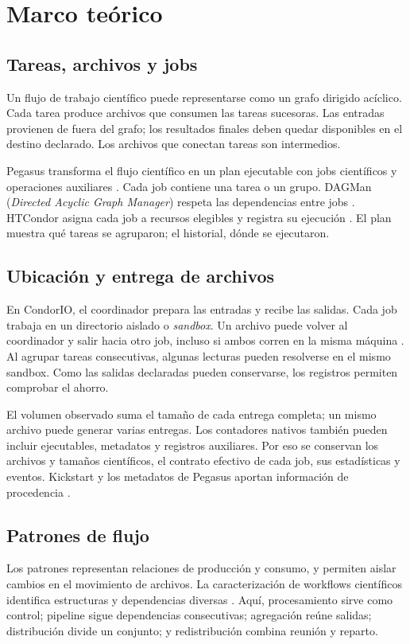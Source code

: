 \chapter{Marco teórico}
\label{ch:marco}
\section{Tareas, archivos y jobs}
Un flujo de trabajo científico puede representarse como un grafo dirigido acíclico. Cada tarea produce archivos que consumen las tareas sucesoras. Las entradas provienen de fuera del grafo; los resultados finales deben quedar disponibles en el destino declarado. Los archivos que conectan tareas son intermedios.

Pegasus transforma el flujo científico en un plan ejecutable con jobs científicos y operaciones auxiliares \citep{deelman2015}. Cada job contiene una tarea o un grupo. DAGMan (\textit{Directed Acyclic Graph Manager}) respeta las dependencias entre jobs \citep{htcondordagman}. HTCondor asigna cada job a recursos elegibles y registra su ejecución \citep{htcondorintro}. El plan muestra qué tareas se agruparon; el historial, dónde se ejecutaron.

\section{Ubicación y entrega de archivos}
En CondorIO, el coordinador prepara las entradas y recibe las salidas. Cada job trabaja en un directorio aislado o \textit{sandbox}. Un archivo puede volver al coordinador y salir hacia otro job, incluso si ambos corren en la misma máquina \citep{htcondorordinary,pegasustransfers}. Al agrupar tareas consecutivas, algunas lecturas pueden resolverse en el mismo sandbox. Como las salidas declaradas pueden conservarse, los registros permiten comprobar el ahorro.

El volumen observado suma el tamaño de cada entrega completa; un mismo archivo puede generar varias entregas. Los contadores nativos también pueden incluir ejecutables, metadatos y registros auxiliares. Por eso se conservan los archivos y tamaños científicos, el contrato efectivo de cada job, sus estadísticas y eventos. Kickstart y los metadatos de Pegasus aportan información de procedencia \citep{pegasusprovenance}.

\section{Patrones de flujo}
Los patrones representan relaciones de producción y consumo, y permiten aislar cambios en el movimiento de archivos. La caracterización de workflows científicos identifica estructuras y dependencias diversas \citep{bharathi2008}. Aquí, procesamiento sirve como control; pipeline sigue dependencias consecutivas; agregación reúne salidas; distribución divide un conjunto; y redistribución combina reunión y reparto.


